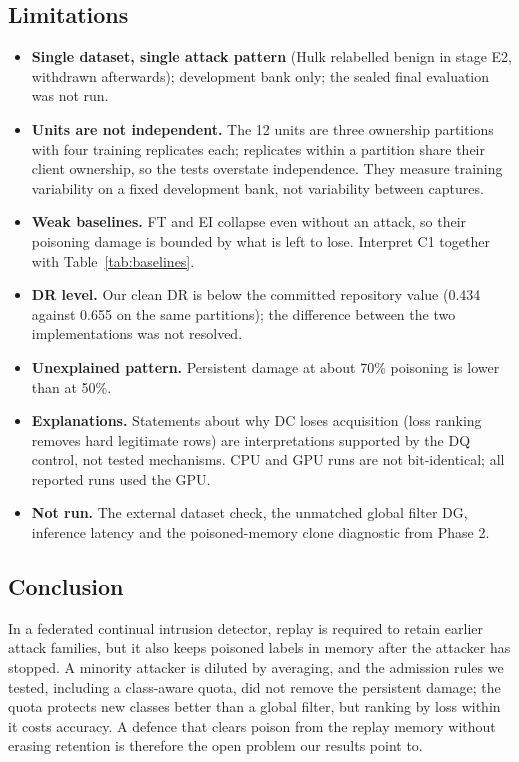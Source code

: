 \documentclass[10pt,a4paper]{article}
\begin{document}
\subsection{Limitations}
\begin{itemize}
\item \textbf{Single dataset, single attack pattern} (Hulk relabelled benign in stage E2, withdrawn afterwards); development bank only; the sealed final evaluation was not run.
\item \textbf{Units are not independent.} The 12 units are three ownership partitions with four training replicates each; replicates within a partition share their client ownership, so the tests overstate independence. They measure training variability on a fixed development bank, not variability between captures.
\item \textbf{Weak baselines.} FT and EI collapse even without an attack, so their poisoning damage is bounded by what is left to lose. Interpret C1 together with Table~\ref{tab:baselines}.
\item \textbf{DR level.} Our clean DR is below the committed repository value (0.434 against 0.655 on the same partitions); the difference between the two implementations was not resolved.
\item \textbf{Unexplained pattern.} Persistent damage at about 70\% poisoning is lower than at 50\%.
\item \textbf{Explanations.} Statements about why DC loses acquisition (loss ranking removes hard legitimate rows) are interpretations supported by the DQ control, not tested mechanisms. CPU and GPU runs are not bit-identical; all reported runs used the GPU.
\item \textbf{Not run.} The external dataset check, the unmatched global filter DG, inference latency and the poisoned-memory clone diagnostic from Phase 2.
\end{itemize}

\subsection{Conclusion}
In a federated continual intrusion detector, replay is required to retain earlier attack families, but it also keeps poisoned labels in memory after the attacker has stopped. A minority attacker is diluted by averaging, and the admission rules we tested, including a class-aware quota, did not remove the persistent damage; the quota protects new classes better than a global filter, but ranking by loss within it costs accuracy. A defence that clears poison from the replay memory without erasing retention is therefore the open problem our results point to.
\end{document}

